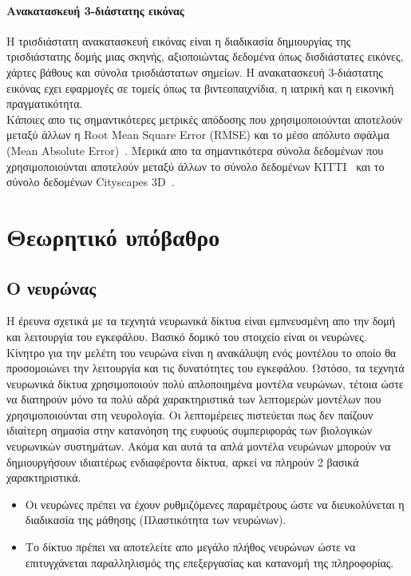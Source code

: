 \documentclass[12pt]{article}
\numberwithin{equation}{section}
\begin{document}
\paragraph{Ανακατασκευή 3-διάστατης εικόνας\\[0.5cm]}

Η τρισδιάστατη ανακατασκευή εικόνας είναι η διαδικασία δημιουργίας της τρισδιάστατης δομής μιας σκηνής, αξιοποιώντας δεδομένα όπως δισδιάστατες εικόνες, χάρτες βάθους και σύνολα τρισδιάστατων σημείων. Η ανακατασκευή 3-διάστατης εικόνας εχει εφαρμογές σε τομείς όπως τα βιντεοπαιχνίδια, η ιατρική και η εικονική πραγματικότητα.\\

Κάποιες απο τις σημαντικότερες μετρικές απόδοσης που χρησιμοποιούνται αποτελούν μεταξύ άλλων η Root Mean Square Error (RMSE) και το μέσο απόλυτο σφάλμα (Mean Absolute Error)~\cite{s24072314}. Μερικά απο τα σημαντικότερα σύνολα δεδομένων που χρησιμοποιούνται αποτελούν μεταξύ άλλων το σύνολο δεδομένων KITTI~\cite{Geiger2013IJRR} και το σύνολο δεδομένων Cityscapes 3D~\cite{gählert2020cityscapes3ddatasetbenchmark}.
\newpage

\section{Θεωρητικό υπόβαθρο}

\subsection{Ο νευρώνας}

Η έρευνα σχετικά με τα τεχνητά νευρωνικά δίκτυα είναι εμπνευσμένη απο την δομή και λειτουργία του εγκεφάλου. Βασικό δομικό του στοιχείο είναι  οι νευρώνες. Κίνητρο για την μελέτη του νευρώνα είναι η ανακάλυψη ενός μοντέλου το οποίο θα προσομοιώνει την λειτουργία και τις δυνατότητες του εγκεφάλου. Ωστόσο, τα τεχνητά νευρωνικά δίκτυα χρησιμοποιούν πολύ απλοποιημένα μοντέλα νευρώνων, τέτοια ώστε να διατηρούν μόνο τα πολύ αδρά χαρακτηριστικά των λεπτομερών μοντέλων που χρησιμοποιούνται στη νευρολογία. Οι λεπτομέρειες πιστεύεται πως δεν παίζουν ιδιαίτερη σημασία στην κατανόηση της ευφυούς συμπεριφοράς των βιολογικών νευρωνικών συστημάτων. Ακόμα και αυτά τα απλά μοντέλα νευρώνων μπορούν να δημιουργήσουν ιδιαιτέρως ενδιαφέροντα δίκτυα, αρκεί να πληρούν 2 βασικά χαρακτηριστικά.

\begin{itemize}
    \item Οι νευρώνες πρέπει να έχουν ρυθμιζόμενες παραμέτρους ώστε να διευκολύνεται η διαδικασία της μάθησης (Πλαστικότητα των νευρώνων).
    \item Το δίκτυο πρέπει να αποτελείτε απο μεγάλο πλήθος νευρώνων ώστε να επιτυγχάνεται παραλληλισμός της επεξεργασίας και κατανομή της πληροφορίας.
\end{itemize}
\end{document}
